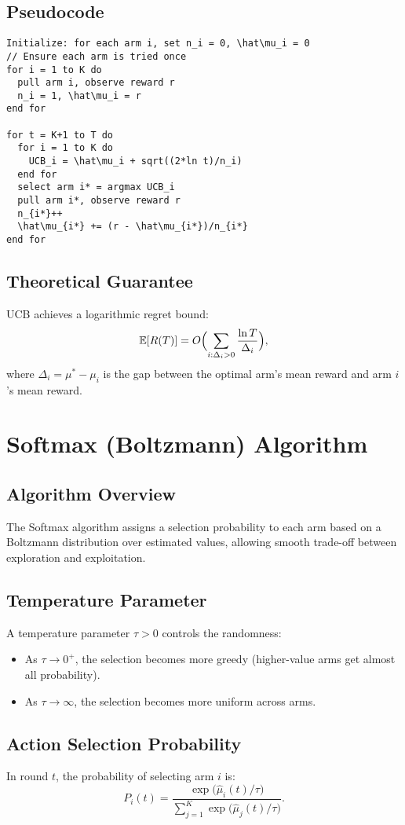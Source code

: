 \documentclass{article}
\begin{document}
\subsection{Pseudocode}
\begin{verbatim}
Initialize: for each arm i, set n_i = 0, \hat\mu_i = 0
// Ensure each arm is tried once
for i = 1 to K do
  pull arm i, observe reward r
  n_i = 1, \hat\mu_i = r
end for

for t = K+1 to T do
  for i = 1 to K do
    UCB_i = \hat\mu_i + sqrt((2*ln t)/n_i)
  end for
  select arm i* = argmax UCB_i
  pull arm i*, observe reward r
  n_{i*}++
  \hat\mu_{i*} += (r - \hat\mu_{i*})/n_{i*}
end for
\end{verbatim}

\subsection{Theoretical Guarantee}
UCB achieves a logarithmic regret bound:
\[
\mathbb{E}[R(T)] = O\Bigl(\sum_{i:\Delta_i>0} \frac{\ln T}{\Delta_i} \Bigr),
\]
where $\Delta_i = \mu^* - \mu_i$ is the gap between the optimal arm’s mean reward and arm $i$’s mean reward.

\section{Softmax (Boltzmann) Algorithm}
\subsection{Algorithm Overview}
The Softmax algorithm assigns a selection probability to each arm based on a Boltzmann distribution over estimated values, allowing smooth trade-off between exploration and exploitation.

\subsection{Temperature Parameter}
A temperature parameter $\tau>0$ controls the randomness:
\begin{itemize}
  \item As $\tau \to 0^{+}$, the selection becomes more greedy (higher-value arms get almost all probability).
  \item As $\tau \to \infty$, the selection becomes more uniform across arms.
\end{itemize}

\subsection{Action Selection Probability}
In round $t$, the probability of selecting arm $i$ is:
\[
P_i(t) = \frac{\exp\bigl(\hat\mu_i(t)/\tau\bigr)}{\sum_{j=1}^K \exp\bigl(\hat\mu_j(t)/\tau\bigr)}.
\]
\end{document}
